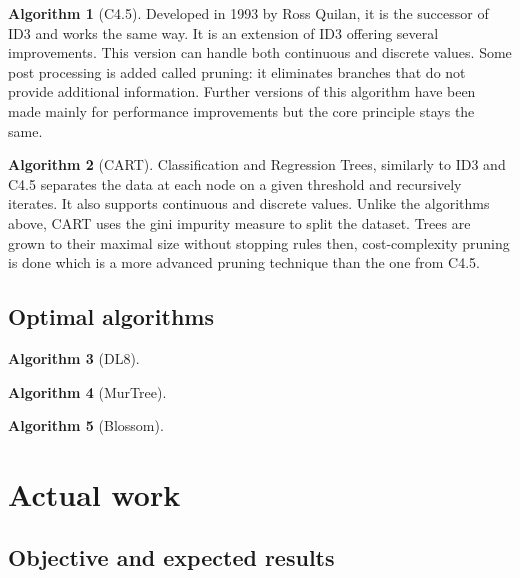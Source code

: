 \documentclass[12pt]{report}
\theoremstyle{definition}
\theoremstyle{definition}
\newtheorem*{algo}{Algorithm}
\begin{document}
\begin{algo}[C4.5]
    Developed in 1993 by Ross Quilan, it is the successor of ID3 and works the same way. It is an extension
    of ID3 offering several improvements. This version can handle both continuous and discrete values.
    Some post processing is added called pruning: it eliminates branches that do not provide additional
    information. Further versions of this algorithm have been made mainly for performance improvements but
    the core principle stays the same.
\end{algo}

\begin{algo}[CART]
    Classification and Regression Trees, similarly to ID3 and C4.5 separates the data at each node on a given
    threshold and recursively iterates. It also supports continuous and discrete values. Unlike the algorithms
    above, CART uses the gini impurity measure to split the dataset. Trees are grown to their maximal size
    without stopping rules then, cost-complexity pruning is done which is a more advanced pruning technique
    than the one from C4.5.
\end{algo}

\section{Optimal algorithms}
\begin{algo}[DL8]
\end {algo}

\begin{algo}[MurTree]
\end {algo}

\begin{algo}[Blossom]
\end {algo}


\chapter{Actual work}
\section{Objective and expected results}
\end{document}
